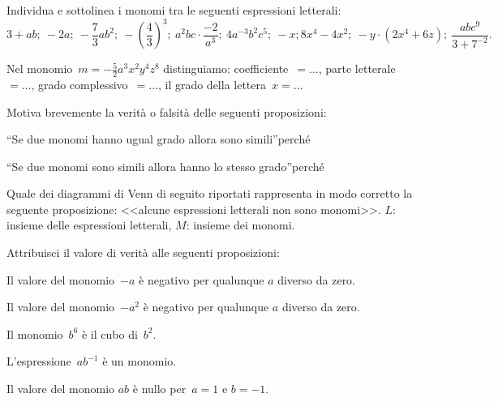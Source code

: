\begin{esercizio}
 \label{ese:9.8}
Individua e sottolinea i monomi tra le seguenti espressioni letterali:
\[3+ab;\:-2a;\:-\frac{7}{3}ab^2;\:-(\frac{4}{3})^{3};\:a^{2}bc\cdot{\frac{-2}{a^{3}}};\:4a^{-3}b^{2}c^{5};\:-x; 8x^{4}-4x^{2};\:-y\cdot(2x^{4}+6z);\:\frac{abc^{9}}{3+7^{-2}}.\]
\end{esercizio}

\begin{esercizio}
 \label{ese:9.9}
Nel monomio~$m=-{\frac{5}{2}}a^{3}x^{2}y^{4}z^{8}$ distinguiamo: coefficiente~$=\ldots$,
parte letterale~$=\ldots$,
grado complessivo~$=\ldots$,
il grado della lettera~$x=\ldots$
\end{esercizio}

\begin{esercizio}
 \label{ese:9.10}
Motiva brevemente la verità o falsità delle seguenti proposizioni:
\TabPositions{8.5cm}
\begin{enumeratea}
 \item ``Se due monomi hanno ugual grado allora sono simili''\tab\boxV\quad\boxF\qquad perché\dotfill
 \item ``Se due monomi sono simili allora hanno lo stesso grado''\tab\boxV\quad\boxF\qquad perché\dotfill
\end{enumeratea}
\end{esercizio}

\begin{esercizio}
 \label{ese:9.11}
Quale dei diagrammi di Venn di seguito riportati rappresenta in modo corretto la seguente proposizione: <<alcune espressioni letterali non sono monomi>>.
$L$: insieme delle espressioni letterali, $M$: insieme dei monomi.
\begin{center}

\end{center}
\end{esercizio}

\begin{esercizio}
 \label{ese:9.12}
 Attribuisci il valore di verità alle seguenti proposizioni:
\TabPositions{11.5cm}
\begin{enumeratea}
\item Il valore del monomio~$-a$ è negativo per qualunque $a$ diverso da zero.\tab\boxV\quad\boxF
\item Il valore del monomio~$-a^{2}$ è negativo per qualunque $a$ diverso da zero.\tab\boxV\quad\boxF
\item Il monomio~$b^{6}$ è il cubo di~$b^{2}$.\tab\boxV\quad\boxF
\item L'espressione~$ab^{-1}$ è un monomio.\tab\boxV\quad\boxF
\item Il valore del monomio $ab$ è nullo per~$a = 1$ e $b =-1$.\tab\boxV\quad\boxF
\end{enumeratea}
\end{esercizio}


